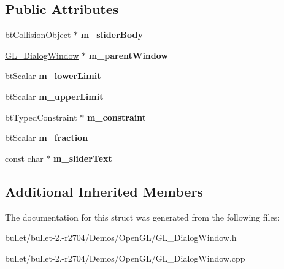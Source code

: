 \subsection*{Public Attributes}
\begin{DoxyCompactItemize}
\item 
\hypertarget{struct_g_l___slider_control_ab4617e6925039feec8f1cc427c88473c}{bt\+Collision\+Object $\ast$ {\bfseries m\+\_\+slider\+Body}}\label{struct_g_l___slider_control_ab4617e6925039feec8f1cc427c88473c}

\item 
\hypertarget{struct_g_l___slider_control_a697cffbb1a0054580f4226be8e888df6}{\hyperlink{class_g_l___dialog_window}{G\+L\+\_\+\+Dialog\+Window} $\ast$ {\bfseries m\+\_\+parent\+Window}}\label{struct_g_l___slider_control_a697cffbb1a0054580f4226be8e888df6}

\item 
\hypertarget{struct_g_l___slider_control_a261daf4cc713af20a0a7e704136b5c31}{bt\+Scalar {\bfseries m\+\_\+lower\+Limit}}\label{struct_g_l___slider_control_a261daf4cc713af20a0a7e704136b5c31}

\item 
\hypertarget{struct_g_l___slider_control_a58222e6f472177322f40119ccd603f84}{bt\+Scalar {\bfseries m\+\_\+upper\+Limit}}\label{struct_g_l___slider_control_a58222e6f472177322f40119ccd603f84}

\item 
\hypertarget{struct_g_l___slider_control_aebd5a2a875132ff13ac304c2863371aa}{bt\+Typed\+Constraint $\ast$ {\bfseries m\+\_\+constraint}}\label{struct_g_l___slider_control_aebd5a2a875132ff13ac304c2863371aa}

\item 
\hypertarget{struct_g_l___slider_control_aa4d1cf188e5769786a3f00218816eb5b}{bt\+Scalar {\bfseries m\+\_\+fraction}}\label{struct_g_l___slider_control_aa4d1cf188e5769786a3f00218816eb5b}

\item 
\hypertarget{struct_g_l___slider_control_a8beaf3223e9725b05f6bc4f1761f9ab5}{const char $\ast$ {\bfseries m\+\_\+slider\+Text}}\label{struct_g_l___slider_control_a8beaf3223e9725b05f6bc4f1761f9ab5}

\end{DoxyCompactItemize}
\subsection*{Additional Inherited Members}


The documentation for this struct was generated from the following files\+:\begin{DoxyCompactItemize}
\item 
bullet/bullet-\/2.-\/r2704/\+Demos/\+Open\+G\+L/G\+L\+\_\+\+Dialog\+Window.\+h\item 
bullet/bullet-\/2.-\/r2704/\+Demos/\+Open\+G\+L/G\+L\+\_\+\+Dialog\+Window.\+cpp\end{DoxyCompactItemize}
